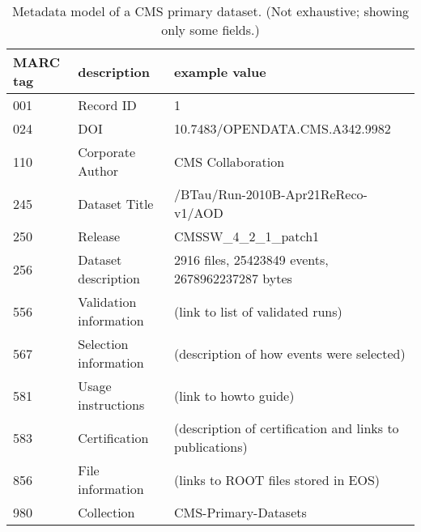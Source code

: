 \begin{table}
  \begin{center}
    \small
\begin{tabular}{|l|l|l|} \hline
\textbf{MARC tag} & \textbf{description} & \textbf{example value} \\ \hline
001 & Record ID & 1 \\ \hline
024 & DOI & 10.7483/OPENDATA.CMS.A342.9982 \\ \hline
110 & Corporate Author & CMS Collaboration \\ \hline
245 & Dataset Title & /BTau/Run-2010B-Apr21ReReco-v1/AOD \\ \hline
250 & Release & CMSSW\_4\_2\_1\_patch1 \\ \hline
256 & Dataset description & 2916 files, 25423849 events, 2678962237287
bytes \\ \hline
556 & Validation information & (link to list of validated runs) \\ \hline
567 & Selection information & (description of how events were
selected) \\ \hline
581 & Usage instructions & (link to howto guide) \\ \hline
583 & Certification & (description of certification and links to
publications) \\ \hline
856 & File information & (links to ROOT files stored in EOS) \\ \hline
980 & Collection & CMS-Primary-Datasets \\ \hline
\end{tabular}
\caption{Metadata model of a CMS primary dataset.  (Not exhaustive;
  showing only some fields.)}
  \end{center}
\end{table}
